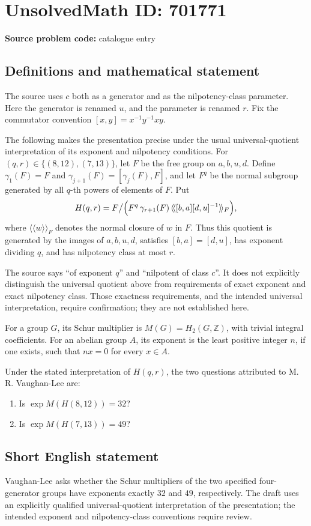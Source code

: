 \documentclass[11pt]{article}
\newcommand{\Z}{\mathbb{Z}}
\begin{document}
\section*{UnsolvedMath ID: 701771}
\textbf{Source problem code:} catalogue entry
\subsection{Definitions and mathematical statement}
The source uses \(c\) both as a generator and as the nilpotency-class parameter. Here the generator is renamed \(u\), and the parameter is renamed \(r\). Fix the commutator convention \([x,y]=x^{-1}y^{-1}xy\).

The following makes the presentation precise under the usual universal-quotient interpretation of its exponent and nilpotency conditions. For \((q,r)\in\{(8,12),(7,13)\}\), let \(F\) be the free group on \(a,b,u,d\). Define \(\gamma_1(F)=F\) and \(\gamma_{j+1}(F)=[\gamma_j(F),F]\), and let \(F^q\) be the normal subgroup generated by all \(q\)-th powers of elements of \(F\). Put
\[
H(q,r)=F\big/\Bigl(F^q\,\gamma_{r+1}(F)\,\langle\!\langle[b,a][d,u]^{-1}\rangle\!\rangle_F\Bigr),
\]
where \(\langle\!\langle w\rangle\!\rangle_F\) denotes the normal closure of \(w\) in \(F\). Thus this quotient is generated by the images of \(a,b,u,d\), satisfies \([b,a]=[d,u]\), has exponent dividing \(q\), and has nilpotency class at most \(r\).

The source says ``of exponent \(q\)'' and ``nilpotent of class \(c\)''. It does not explicitly distinguish the universal quotient above from requirements of exact exponent and exact nilpotency class. Those exactness requirements, and the intended universal interpretation, require confirmation; they are not established here.

For a group \(G\), its Schur multiplier is \(M(G)=H_2(G,\Z)\), with trivial integral coefficients. For an abelian group \(A\), its exponent is the least positive integer \(n\), if one exists, such that \(nx=0\) for every \(x\in A\).

Under the stated interpretation of \(H(q,r)\), the two questions attributed to M. R. Vaughan-Lee are:
\begin{enumerate}
\item[(a)] Is \(\operatorname{exp} M(H(8,12))=32\)?
\item[(b)] Is \(\operatorname{exp} M(H(7,13))=49\)?
\end{enumerate}
\subsection{Short English statement}
Vaughan-Lee asks whether the Schur multipliers of the two specified four-generator groups have exponents exactly \(32\) and \(49\), respectively. The draft uses an explicitly qualified universal-quotient interpretation of the presentation; the intended exponent and nilpotency-class conventions require review.
\end{document}
